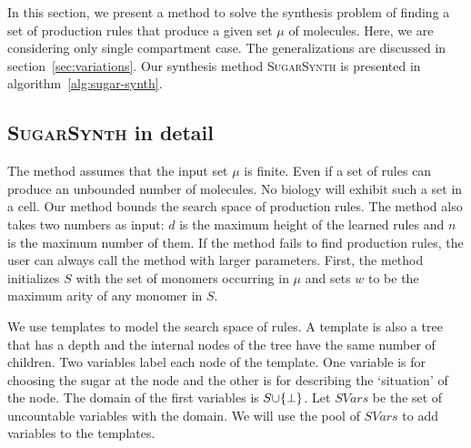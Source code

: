 In this section, we present a method to solve the synthesis problem of finding
a set of production rules that produce a given set $\mu$ of molecules.
Here, we are considering only single compartment case.
The generalizations are discussed in section~\ref{sec:variations}.
Our synthesis method \textsc{SugarSynth} is presented in algorithm~\ref{alg:sugar-synth}.




\subsection{\textsc{SugarSynth} in detail}

The method assumes that the input set $\mu$ is finite.
Even if a set of rules can produce
an unbounded number of molecules.
No biology will exhibit such a set in a cell.
Our method
bounds the search space of production rules.
The method also takes two numbers as input:
$d$ is the maximum height of the learned rules
and 
$n$ is the maximum number of them.
If the method fails to find production rules,
the user can always call the method with larger parameters.
First, the method initializes $S$ with the set of monomers occurring
in $\mu$
and sets $w$ to be the maximum arity of any monomer in $S$.


We use templates to model the search space of rules.
A template is also a tree that has a depth and
the internal nodes of the tree have the same number of children.
Two variables label each node of the template.
One variable is for choosing the sugar at the node and the other is for describing
the `situation' of the node.
The domain of the first variables is $S {\cup} \{\bot\}$.
Let $SVars$ be the set of uncountable variables with the domain.
We will use the pool of $SVars$ to add variables to the templates.

